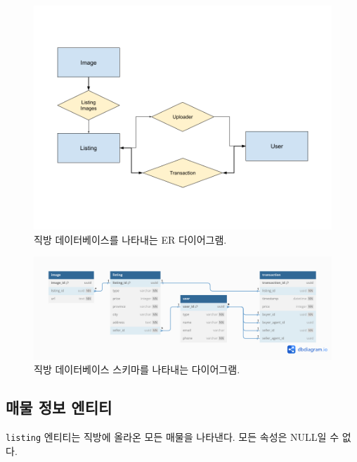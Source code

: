 \documentclass{article}
\newcommand\code[1]{
  \texttt{\large{#1}}
}
\begin{document}
\begin{figure}[H]
  \includegraphics[width=\linewidth]{er-diagram.png}
  \caption{직방 데이터베이스를 나타내는 ER 다이어그램.}
  \label{fig:er-diagram}
\end{figure}

\begin{figure}[H]
  \includegraphics[width=\linewidth]{schema-diagram.png}
  \caption{직방 데이터베이스 스키마를 나타내는 다이어그램.}
  \label{fig:schema-diagram}
\end{figure}
\newpage

\subsection{매물 정보 엔티티}

\code{listing} 엔티티는 직방에 올라온 모든 매물을 나타낸다.
모든 속성은 NULL일 수 없다.
\end{document}
